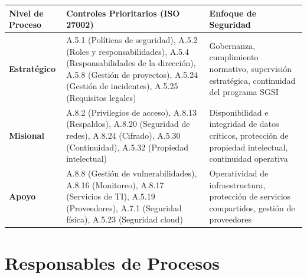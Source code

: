 \documentclass[10pt,letterpaper]{article}
\begin{document}
{\setlength{\RaggedRightRightskip}{0pt plus 5em}\small\sloppy \begin{longtable}[]{@{}
  >{\hspace{0pt}\RaggedRight\arraybackslash}p{}
  >{\hspace{0pt}\RaggedRight\arraybackslash}p{}
  >{\hspace{0pt}\RaggedRight\arraybackslash}p{}@{}}
\toprule\noalign{}
\begin{minipage}[b]{\linewidth}\raggedright
Nivel de Proceso
\end{minipage} & \begin{minipage}[b]{\linewidth}\raggedright
Controles Prioritarios (ISO 27002)
\end{minipage} & \begin{minipage}[b]{\linewidth}\raggedright
Enfoque de Seguridad
\end{minipage} \\
\midrule\noalign{}
\endhead
\bottomrule\noalign{}
\endlastfoot
\textbf{Estratégico} & A.5.1 (Políticas de seguridad), A.5.2 (Roles y
responsabilidades), A.5.4 (Responsabilidades de la dirección), A.5.8
(Gestión de proyectos), A.5.24 (Gestión de incidentes), A.5.25
(Requisitos legales) & Gobernanza, cumplimiento normativo, supervisión
estratégica, continuidad del programa SGSI \\
\textbf{Misional} & A.8.2 (Privilegios de acceso), A.8.13 (Respaldos),
A.8.20 (Seguridad de redes), A.8.24 (Cifrado), A.5.30 (Continuidad),
A.5.32 (Propiedad intelectual) & Disponibilidad e integridad de datos
críticos, protección de propiedad intelectual, continuidad operativa \\
\textbf{Apoyo} & A.8.8 (Gestión de vulnerabilidades), A.8.16
(Monitoreo), A.8.17 (Servicios de TI), A.5.19 (Proveedores), A.7.1
(Seguridad física), A.5.23 (Seguridad cloud) & Operatividad de
infraestructura, protección de servicios compartidos, gestión de
proveedores \\
\end{longtable}\normalsize}

\section{Responsables de Procesos}\label{responsables-de-procesos}
\end{document}
